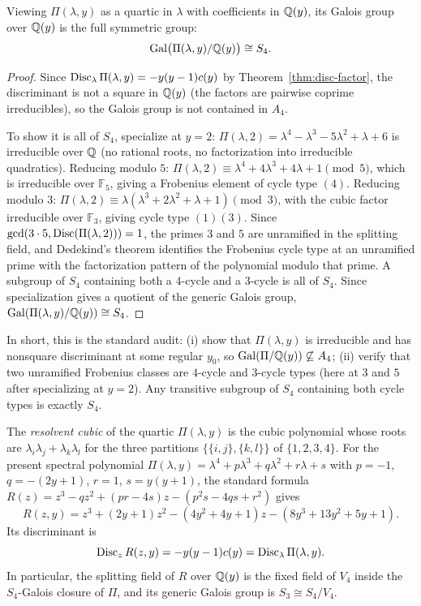 \begin{proposition}\label{prop:galois-s4}
Viewing $\Pi(\lambda,y)$ as a quartic in $\lambda$ with coefficients in $\mathbb{Q}(y)$,
its Galois group over $\mathbb{Q}(y)$ is the full symmetric group:
\[
\mathrm{Gal}\bigl(\Pi(\lambda,y)/\mathbb{Q}(y)\bigr)\cong S_4.
\]
\end{proposition}

\begin{proof}
Since $\operatorname{Disc}_\lambda \Pi(\lambda,y)=-y(y-1)c(y)$ by Theorem~\ref{thm:disc-factor}, the discriminant is not a square in $\mathbb{Q}(y)$ (the factors are pairwise coprime irreducibles), so the Galois group is not contained in $A_4$.

To show it is all of $S_4$, specialize at $y=2$: $\Pi(\lambda,2)=\lambda^4-\lambda^3-5\lambda^2+\lambda+6$ is irreducible over $\mathbb{Q}$ (no rational roots, no factorization into irreducible quadratics).
Reducing modulo $5$: $\Pi(\lambda,2)\equiv \lambda^4+4\lambda^3+4\lambda+1\pmod{5}$, which is irreducible over $\mathbb{F}_5$, giving a Frobenius element of cycle type $(4)$.
Reducing modulo $3$: $\Pi(\lambda,2)\equiv \lambda(\lambda^3+2\lambda^2+\lambda+1)\pmod{3}$, with the cubic factor irreducible over $\mathbb{F}_3$, giving cycle type $(1)(3)$.
Since $\gcd(3\cdot 5,\operatorname{Disc}(\Pi(\lambda,2)))=1$, the primes $3$ and $5$ are unramified in the splitting field, and Dedekind's theorem identifies the Frobenius cycle type at an unramified prime with the factorization pattern of the polynomial modulo that prime.
A subgroup of $S_4$ containing both a $4$-cycle and a $3$-cycle is all of $S_4$.
Since specialization gives a quotient of the generic Galois group,
$\mathrm{Gal}(\Pi(\lambda,y)/\mathbb{Q}(y))\cong S_4$.
\end{proof}

\begin{remark}\label{rmk:galois-s4-criterion}
In short, this is the standard audit:
(i) show that \(\Pi(\lambda,y)\) is irreducible and has nonsquare discriminant at some regular \(y_0\), so \(\mathrm{Gal}(\Pi/\mathbb{Q}(y))\not\subseteq A_4\);
(ii) verify that two unramified Frobenius classes are \(4\)-cycle and \(3\)-cycle types (here at \(3\) and \(5\) after specializing at \(y=2\)).
Any transitive subgroup of \(S_4\) containing both cycle types is exactly \(S_4\).
\end{remark}

\begin{proposition}\label{prop:resolvent-cubic}
The \emph{resolvent cubic} of the quartic $\Pi(\lambda,y)$ is the cubic polynomial whose roots are $\lambda_i\lambda_j+\lambda_k\lambda_l$ for the three partitions $\{\{i,j\},\{k,l\}\}$ of $\{1,2,3,4\}$.
For the present spectral polynomial $\Pi(\lambda,y)=\lambda^4+p\lambda^3+q\lambda^2+r\lambda+s$ with $p=-1$, $q=-(2y+1)$, $r=1$, $s=y(y+1)$, the standard formula $R(z)=z^3-qz^2+(pr-4s)z-(p^2 s-4qs+r^2)$ gives
\[
R(z,y)=z^3+(2y+1)z^2-(4y^2+4y+1)z-(8y^3+13y^2+5y+1).
\]
Its discriminant is
\[
\operatorname{Disc}_z R(z,y)=-y(y-1)c(y)=\operatorname{Disc}_\lambda\Pi(\lambda,y).
\]
In particular, the splitting field of \(R\) over \(\mathbb{Q}(y)\) is the fixed field of \(V_4\) inside the \(S_4\)-Galois closure of \(\Pi\), and its generic Galois group is \(S_3\cong S_4/V_4\).
\end{proposition}

